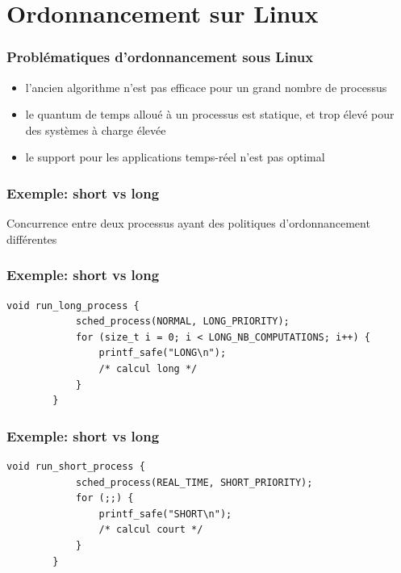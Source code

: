 \documentclass{beamer}
\begin{document}
\section{Ordonnancement sur Linux}

\begin{frame}
    \frametitle{Problématiques d'ordonnancement sous Linux}

    \begin{itemize}
        \item<2-> l'ancien algorithme n'est pas efficace pour un grand nombre
            de processus
        \item<3-> le quantum de temps alloué à un processus est statique, et
            trop élevé pour des systèmes à charge élevée
        \item<4-> le support pour les applications temps-réel n'est pas optimal
    \end{itemize}
\end{frame}

\begin{frame}
    \frametitle{Exemple: short vs long}

    \begin{center}
        \huge
        Concurrence entre deux processus ayant des politiques d'ordonnancement
        différentes
    \end{center}
\end{frame}

\begin{frame}[fragile]
    \frametitle{Exemple: short vs long}

    \begin{lstlisting}[caption=processus long]
        void run_long_process {
            sched_process(NORMAL, LONG_PRIORITY);
            for (size_t i = 0; i < LONG_NB_COMPUTATIONS; i++) {
                printf_safe("LONG\n");
                /* calcul long */
            }
        }
    \end{lstlisting}
\end{frame}

\begin{frame}[fragile]
    \frametitle{Exemple: short vs long}

    \begin{lstlisting}[caption=processus court]
        void run_short_process {
            sched_process(REAL_TIME, SHORT_PRIORITY);
            for (;;) {
                printf_safe("SHORT\n");
                /* calcul court */
            }
        }
    \end{lstlisting}
\end{frame}
\end{document}

